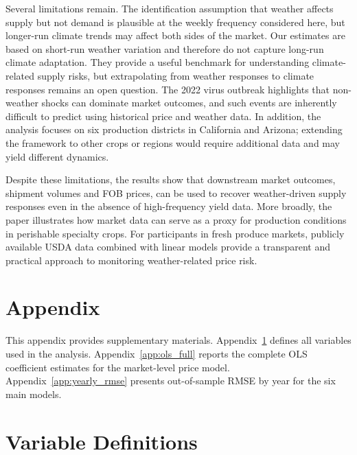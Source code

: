 \documentclass[12pt]{article}
\begin{document}
Several limitations remain. The identification assumption that weather affects supply but not demand is plausible at the weekly frequency considered here, but longer-run climate trends may affect both sides of the market. Our estimates are based on short-run weather variation and therefore do not capture long-run climate adaptation. They provide a useful benchmark for understanding climate-related supply risks, but extrapolating from weather responses to climate responses remains an open question. The 2022 virus outbreak highlights that non-weather shocks can dominate market outcomes, and such events are inherently difficult to predict using historical price and weather data. In addition, the analysis focuses on six production districts in California and Arizona; extending the framework to other crops or regions would require additional data and may yield different dynamics.

Despite these limitations, the results show that downstream market outcomes, shipment volumes and FOB prices, can be used to recover weather-driven supply responses even in the absence of high-frequency yield data. More broadly, the paper illustrates how market data can serve as a proxy for production conditions in perishable specialty crops. For participants in fresh produce markets, publicly available USDA data combined with linear models provide a transparent and practical approach to monitoring weather-related price risk.

\newpage



\newpage
\appendix
{}
\section*{Appendix}

This appendix provides supplementary materials. Appendix~\ref{app:variables} defines all variables used in the analysis. Appendix~\ref{app:ols_full} reports the complete OLS coefficient estimates for the market-level price model. Appendix~\ref{app:yearly_rmse} presents out-of-sample RMSE by year for the six main models.

\section{Variable Definitions}
\label{app:variables}
\end{document}
